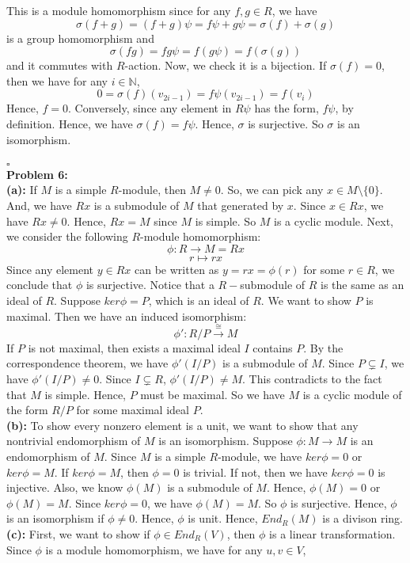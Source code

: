 \documentclass[12pt]{amsart}
\newcommand{\N}{\mathbb{N}}
\begin{document}
This is a module homomorphism since for any $f,g\in R$, we have 
\[\sigma(f+g)=(f+g)\psi=f\psi+g\psi=\sigma(f)+\sigma(g)\]
is a group homomorphism and 
\[\sigma(fg)=fg\psi=f(g\psi)=f(\sigma(g))\]
and it commutes with $R$-action. Now, we check it is a bijection. If $\sigma(f)=0$, then we have for any $i\in \N$, 
\[0=\sigma(f)(v_{2i-1})=f\psi(v_{2i-1})=f(v_i)\]
Hence, $f=0$. Conversely, since any element in $R\psi$ has the form, $f\psi$, by definition. Hence, we have $\sigma(f)=f\psi$. Hence, $\sigma$ is surjective. So $\sigma$ is an isomorphism.\\
\\\phantom{qed}\hfill$\square$\\
\textbf{Problem 6:}\\
\textbf{(a):} If $M$ is a simple $R$-module, then $M\neq 0$. So, we can pick any $x\in M\setminus\{0\}$. And, we have $Rx$ is a submodule of $M$ that generated by $x$. Since $x\in Rx$, we have $Rx\neq 0$. Hence, $Rx=M$ since $M$ is simple. So $M$ is a cyclic module. Next, we consider the following $R$-module homomorphism:
\[\phi: R\to M=Rx\]
\[r\mapsto rx\]
Since any element $y\in Rx$ can be written as $y=rx=\phi(r)$ for some $r\in R$, we conclude that $ \phi$ is surjective. Notice that a $R-$submodule of $R$ is the same as an ideal of $R$. Suppose $ker\phi=P$, which is an ideal of $R$. We want to show $P$ is maximal. Then we have an induced isomorphism:
\[\phi':R/P\xrightarrow{\cong}M\]
If $P$ is not maximal, then exists a maximal ideal $I$ contains $P$. By the correspondence theorem, we have $\phi'(I/P)$ is a submodule of $M$. Since $P\subsetneq I$, we have $\phi'(I/P)\neq 0$. Since $I\subsetneq R$, $\phi'(I/P)\neq M$. This contradicts to the fact that $M$ is simple. Hence, $P$ must be maximal. So we have $M$ is a cyclic module of the form $R/P$ for some maximal ideal $P$.\\
\textbf{(b): }To show every nonzero element is a unit, we want to show that any nontrivial endomorphism of $M$ is an isomorphism. Suppose $\phi:M\to M$ is an endomorphism of $M$. Since $M$ is a simple $R$-module, we have $ker\phi=0$ or $ker\phi=M$. If $ker\phi=M$, then $\phi=0$ is trivial. If not, then we have $ker\phi=0$ is injective. Also, we know $\phi(M)$ is a submodule of $M$. Hence, $\phi(M)=0$ or $\phi(M)=M$. Since $ker\phi=0$, we have $\phi(M)=M$. So $\phi$ is surjective. Hence, $\phi$ is an isomorphism if $\phi\neq 0$. Hence, $\phi$ is unit. Hence, $End_R(M)$ is a divison ring.\\
\textbf{(c):} First, we want to show if $\phi\in End_R(V)$, then $\phi$ is a linear transformation. Since $\phi$ is a module homomorphism, we have for any $u,v\in V$, 
\end{document}
